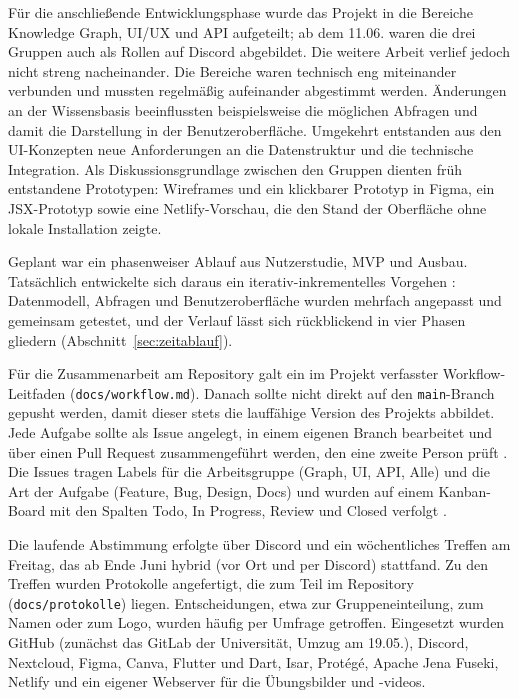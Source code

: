 Für die anschließende Entwicklungsphase wurde das Projekt in die Bereiche Knowledge Graph, UI/UX und API aufgeteilt; ab dem 11.06. waren die drei Gruppen auch als Rollen auf Discord abgebildet. Die weitere Arbeit verlief jedoch nicht streng nacheinander. Die Bereiche waren technisch eng miteinander verbunden und mussten regelmäßig aufeinander abgestimmt werden. Änderungen an der Wissensbasis beeinflussten beispielsweise die möglichen Abfragen und damit die Darstellung in der Benutzeroberfläche. Umgekehrt entstanden aus den UI-Konzepten neue Anforderungen an die Datenstruktur und die technische Integration. Als Diskussionsgrundlage zwischen den Gruppen dienten früh entstandene Prototypen: Wireframes und ein klickbarer Prototyp in Figma, ein JSX-Prototyp sowie eine Netlify-Vorschau, die den Stand der Oberfläche ohne lokale Installation zeigte.

Geplant war ein phasenweiser Ablauf aus Nutzerstudie, MVP und Ausbau. Tatsächlich entwickelte sich daraus ein iterativ-inkrementelles Vorgehen \autocite{larman2003iterative,sommerville2016software}: Datenmodell, Abfragen und Benutzeroberfläche wurden mehrfach angepasst und gemeinsam getestet, und der Verlauf lässt sich rückblickend in vier Phasen gliedern (Abschnitt~\ref{sec:zeitablauf}).

Für die Zusammenarbeit am Repository galt ein im Projekt verfasster Workflow-Leitfaden (\texttt{docs/workflow.md}). Danach sollte nicht direkt auf den \texttt{main}-Branch gepusht werden, damit dieser stets die lauffähige Version des Projekts abbildet. Jede Aufgabe sollte als Issue angelegt, in einem eigenen Branch bearbeitet und über einen Pull Request zusammengeführt werden, den eine zweite Person prüft \autocite{chacon2014progit}. Die Issues tragen Labels für die Arbeitsgruppe (Graph, UI, API, Alle) und die Art der Aufgabe (Feature, Bug, Design, Docs) und wurden auf einem Kanban-Board mit den Spalten Todo, In Progress, Review und Closed verfolgt \autocite{anderson2010kanban}.

Die laufende Abstimmung erfolgte über Discord und ein wöchentliches Treffen am Freitag, das ab Ende Juni hybrid (vor Ort und per Discord) stattfand. Zu den Treffen wurden Protokolle angefertigt, die zum Teil im Repository (\texttt{docs/protokolle}) liegen. Entscheidungen, etwa zur Gruppeneinteilung, zum Namen oder zum Logo, wurden häufig per Umfrage getroffen. Eingesetzt wurden GitHub (zunächst das GitLab der Universität, Umzug am 19.05.), Discord, Nextcloud, Figma, Canva, Flutter und Dart, Isar, Protégé, Apache Jena Fuseki, Netlify und ein eigener Webserver für die Übungsbilder und -videos.

